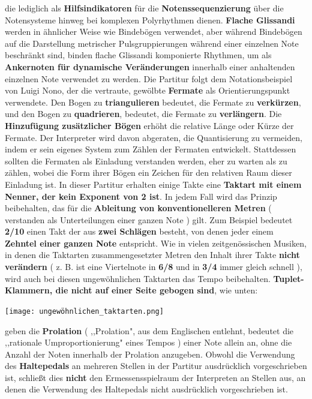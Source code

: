 \documentclass[12pt]{article}
\newcommand*\circled[1]{\tikz[baseline=(char.base)]{
            \node[shape=circle,draw,inner sep=1pt] (char) {#1};}}
\begin{document}
die lediglich als \textbf{Hilfsindikatoren} für die \textbf{Notenssequenzierung} über die Notensysteme hinweg bei komplexen Polyrhythmen dienen. \textbf{\circled{4} Flache Glissandi } werden in ähnlicher Weise wie Bindebögen verwendet, aber während Bindebögen auf die Darstellung metrischer Pulsgruppierungen während einer einzelnen Note beschränkt sind, binden flache Glissandi komponierte Rhythmen, um als \textbf{Ankernoten für dynamische Veränderungen} innerhalb einer anhaltenden einzelnen Note verwendet zu werden. \textbf{\circled{5}} Die Partitur folgt dem Notationsbeispiel von Luigi Nono, der die vertraute, gewölbte \textbf{Fermate} als Orientierungspunkt verwendete. Den Bogen zu \textbf{triangulieren} bedeutet, die Fermate zu \textbf{verkürzen}, und den Bogen zu \textbf{quadrieren}, bedeutet, die Fermate zu \textbf{verlängern}. Die \textbf{Hinzufügung zusätzlicher Bögen} erhöht die relative Länge oder Kürze der Fermate. Der Interpreter wird davon abgeraten, die Quantisierung zu vermeiden, indem er sein eigenes System zum Zählen der Fermaten entwickelt. Stattdessen sollten die Fermaten als Einladung verstanden werden, eher zu warten als zu zählen, wobei die Form ihrer Bögen ein Zeichen für den relativen Raum dieser Einladung ist. \textbf{\circled{6}} In dieser Partitur erhalten einige Takte eine \textbf{Taktart mit einem Nenner, der kein Exponent von 2 ist}. In jedem Fall wird das Prinzip beibehalten, das für die \textbf{Ableitung von konventionelleren Metren} ( verstanden als Unterteilungen einer ganzen Note ) gilt. Zum Beispiel bedeutet \textbf{2/10} einen Takt der aus \textbf{zwei Schlägen} besteht, von denen jeder einem \textbf{Zehntel einer ganzen Note} entspricht. Wie in vielen zeitgenössischen Musiken, in denen die Taktarten zusammengesetzter Metren den Inhalt ihrer Takte \textbf{nicht verändern} ( z. B. ist eine Viertelnote in \textbf{6/8} und in \textbf{3/4} immer gleich schnell ), wird auch bei diesen ungewöhnlichen Taktarten das Tempo beibehalten. \textbf{\circled{7} Tuplet-Klammern, die nicht auf einer Seite gebogen sind}, wie unten:

\begin{center}
\texttt{[image: ungewöhnlichen\_taktarten.png]}
\end{center}

geben die \textbf{Prolation} ( ,,Prolation", aus dem Englischen entlehnt, bedeutet die ,,rationale Umproportionierung" eines Tempos ) einer Note allein an, ohne die Anzahl der Noten innerhalb der Prolation anzugeben. \textbf{\circled{8}} Obwohl die Verwendung des \textbf{Haltepedals} an mehreren Stellen in der Partitur ausdrücklich vorgeschrieben ist, schließt dies \textbf{nicht} den Ermessensspielraum der Interpreten an Stellen aus, an denen die Verwendung des Haltepedals nicht ausdrücklich vorgeschrieben ist.
\endgroup
\end{document}
